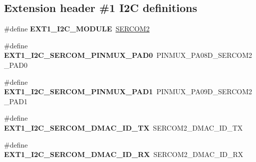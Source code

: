 \subsection*{Extension header \#1 I2\+C definitions}
\begin{DoxyCompactItemize}
\item 
\hypertarget{group__saml21__xplained__pro__features__group_ga9a770caae803fb3f8ae9e01beee386b6}{}\#define {\bfseries E\+X\+T1\+\_\+\+I2\+C\+\_\+\+M\+O\+D\+U\+L\+E}~\hyperlink{group___s_a_m_l21_j18_a__base_ga918e4c85993961a115bb23b4bb73a87f}{S\+E\+R\+C\+O\+M2}\label{group__saml21__xplained__pro__features__group_ga9a770caae803fb3f8ae9e01beee386b6}

\item 
\hypertarget{group__saml21__xplained__pro__features__group_ga3cdd9e4076911af8036c6a0d01159136}{}\#define {\bfseries E\+X\+T1\+\_\+\+I2\+C\+\_\+\+S\+E\+R\+C\+O\+M\+\_\+\+P\+I\+N\+M\+U\+X\+\_\+\+P\+A\+D0}~P\+I\+N\+M\+U\+X\+\_\+\+P\+A08\+D\+\_\+\+S\+E\+R\+C\+O\+M2\+\_\+\+P\+A\+D0\label{group__saml21__xplained__pro__features__group_ga3cdd9e4076911af8036c6a0d01159136}

\item 
\hypertarget{group__saml21__xplained__pro__features__group_ga3b37203ab3cba84dcef2e7bc8a41530e}{}\#define {\bfseries E\+X\+T1\+\_\+\+I2\+C\+\_\+\+S\+E\+R\+C\+O\+M\+\_\+\+P\+I\+N\+M\+U\+X\+\_\+\+P\+A\+D1}~P\+I\+N\+M\+U\+X\+\_\+\+P\+A09\+D\+\_\+\+S\+E\+R\+C\+O\+M2\+\_\+\+P\+A\+D1\label{group__saml21__xplained__pro__features__group_ga3b37203ab3cba84dcef2e7bc8a41530e}

\item 
\hypertarget{group__saml21__xplained__pro__features__group_gade9cb5e26f46927f2ce22356af69d96d}{}\#define {\bfseries E\+X\+T1\+\_\+\+I2\+C\+\_\+\+S\+E\+R\+C\+O\+M\+\_\+\+D\+M\+A\+C\+\_\+\+I\+D\+\_\+\+T\+X}~S\+E\+R\+C\+O\+M2\+\_\+\+D\+M\+A\+C\+\_\+\+I\+D\+\_\+\+T\+X\label{group__saml21__xplained__pro__features__group_gade9cb5e26f46927f2ce22356af69d96d}

\item 
\hypertarget{group__saml21__xplained__pro__features__group_gaec8b03dc380c4b05b0205ddeba9cb72c}{}\#define {\bfseries E\+X\+T1\+\_\+\+I2\+C\+\_\+\+S\+E\+R\+C\+O\+M\+\_\+\+D\+M\+A\+C\+\_\+\+I\+D\+\_\+\+R\+X}~S\+E\+R\+C\+O\+M2\+\_\+\+D\+M\+A\+C\+\_\+\+I\+D\+\_\+\+R\+X\label{group__saml21__xplained__pro__features__group_gaec8b03dc380c4b05b0205ddeba9cb72c}

\end{DoxyCompactItemize}
